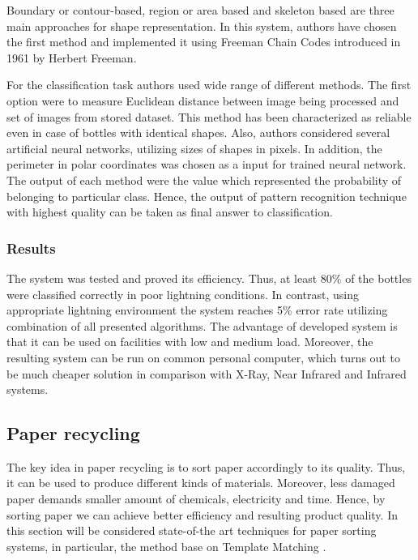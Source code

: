 \documentclass{lutmscthesis}[2010/09/22]
\begin{document}
Boundary or contour-based, region or area based and skeleton based
are three main approaches for shape representation.
In this system, authors have chosen the first method
and implemented it using Freeman Chain Codes introduced
in 1961 by Herbert Freeman.

For the classification task authors used wide range of different
methods. The first option were to measure Euclidean distance between
image being processed and set of images from stored
dataset. This method has been characterized as reliable
even in case of bottles with identical shapes. Also,
authors considered several artificial neural networks,
utilizing sizes of shapes in pixels. In addition,
the perimeter in polar coordinates was chosen
as a input for trained neural network. The output
of each method were the value which represented
the probability of belonging to particular class. Hence, the
output of pattern recognition technique with highest quality
can be taken as final answer to classification.

\subsubsection*{ Results }

The system was tested and proved its efficiency. Thus,
at least 80\% of the bottles were classified correctly
in poor lightning conditions. In contrast, using
appropriate lightning environment the system reaches
5\% error rate utilizing combination of all presented
algorithms. The advantage of developed system is that
it can be used on facilities with low and medium
load. Moreover, the resulting system can be run
on common personal computer, which turns out
to be much cheaper solution in comparison with
X-Ray, Near Infrared and Infrared systems.

\subsection{ Paper recycling }

The key idea in paper recycling is to sort
paper accordingly to its quality. Thus, it can
be used to produce different kinds of materials.
Moreover, less damaged paper demands smaller
amount of chemicals, electricity and time. Hence,
by sorting paper we can achieve better efficiency
and resulting product quality. In this section will be
considered state-of-the art techniques for paper sorting
systems, in particular, the method base on Template Matching
\cite{Rahman:2009}.
\end{document}
